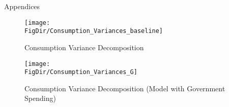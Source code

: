 \documentclass[titlepage]{\econtex}\providecommand{\texname}{Dissertation-Proposal}
\providecommand{\FigDir}{Figures}
\begin{document}








%




\clearpage\vfill\eject

\appendix

\centerline{\LARGE Appendices}\vspace{0.2in}



\begin{figure}{}
    \centering
    \texttt{[image: \\FigDir/Consumption\_Variances\_baseline]}
    \caption{ Consumption Variance Decomposition }
     \label{fig:Persistence_baseline}
\end{figure}

\begin{figure}{}
    \centering
    \texttt{[image: \\FigDir/Consumption\_Variances\_G]}
    \caption{ Consumption Variance Decomposition (Model with Government Spending)}
     \label{fig:Persistence_Gov}
\end{figure}
\end{document}

